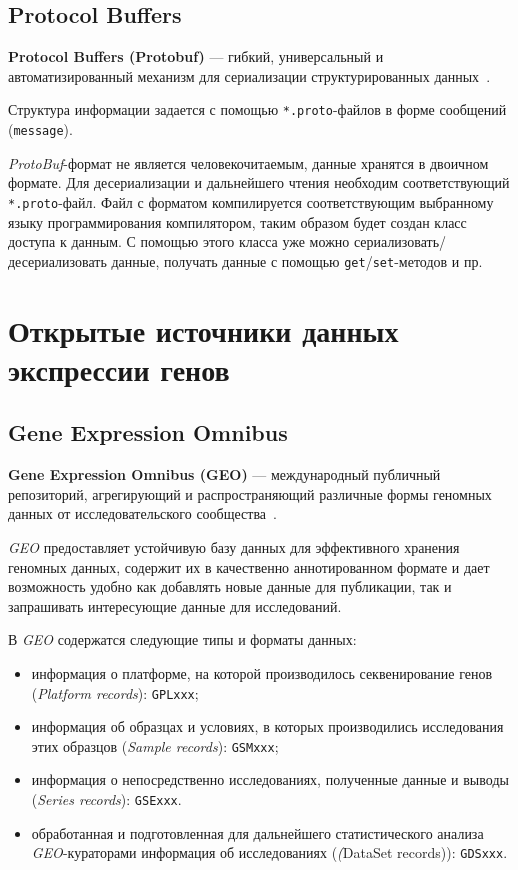 \subsection{Protocol Buffers}
\textbf{Protocol Buffers (Protobuf)} --- гибкий, универсальный и автоматизированный механизм для сериализации структурированных данных~\cite{protobuf}.

Структура информации задается с помощью \texttt{*.proto}-файлов в форме сообщений (\texttt{message}).

\emph{ProtoBuf}-формат не является человекочитаемым, данные хранятся в двоичном формате. Для десериализации и дальнейшего чтения необходим соответствующий \texttt{*.proto}-файл. Файл с форматом компилируется соответствующим выбранному языку программирования компилятором, таким образом будет создан класс доступа к данным. С помощью этого класса уже можно сериализовать/десериализовать данные, получать данные с помощью \texttt{get}/\texttt{set}-методов и пр.

\section{Открытые источники данных экспрессии генов}
\subsection{Gene Expression Omnibus}\label{geointro}
\textbf{Gene Expression Omnibus (GEO)} --- международный публичный репозиторий, агрегирующий и распространяющий различные формы геномных данных от исследовательского сообщества~\cite{geo}.

\emph{GEO} предоставляет устойчивую базу данных для эффективного хранения геномных данных, содержит их в качественно аннотированном формате и дает возможность удобно как добавлять новые данные для публикации, так и запрашивать интересующие данные для исследований.

В \emph{GEO} содержатся следующие типы и форматы данных:
\begin{itemize}
\item информация о платформе, на которой производилось секвенирование генов (\emph{Platform records}): \texttt{GPLxxx};
\item информация об образцах и условиях, в которых производились исследования этих образцов (\emph{Sample records}): \texttt{GSMxxx};
\item информация о непосредственно исследованиях, полученные данные и выводы (\emph{Series records}): \texttt{GSExxx}.
\item обработанная и подготовленная для дальнейшего статистического анализа \emph{GEO}-кураторами информация об исследованиях (\emph(DataSet records)): \texttt{GDSxxx}.
\end{itemize}

